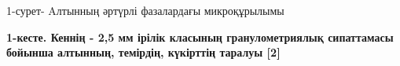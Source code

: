 1-сурет- Aлтынның әртүрлі фазалардағы микроқұрылымы

{\bfseries 1-кесте. Кеннің - 2,5 мм ірілік класының гранулометриялық
сипаттамасы бойынша алтынның, темірдің, күкірттің таралуы {[}2{]}}

% 
% 

